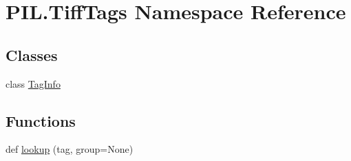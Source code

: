 \hypertarget{namespacePIL_1_1TiffTags}{}\section{P\+I\+L.\+Tiff\+Tags Namespace Reference}
\label{namespacePIL_1_1TiffTags}
\subsection*{Classes}
\begin{DoxyCompactItemize}
\item 
class \hyperlink{classPIL_1_1TiffTags_1_1TagInfo}{Tag\+Info}
\end{DoxyCompactItemize}
\subsection*{Functions}
\begin{DoxyCompactItemize}
\item 
def \hyperlink{namespacePIL_1_1TiffTags_a183a06296cacf105013c25c44156ab9b}{lookup} (tag, group=None)
\end{DoxyCompactItemize}
